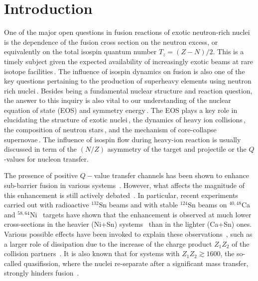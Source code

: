 \section{Introduction}

One of the major open questions in fusion reactions of exotic neutron-rich nuclei
is the dependence of the fusion cross section on the neutron excess,
or equivalently on the total isospin quantum number $T_z = (Z-N)/2$.
This is a timely subject given the expected
availability of increasingly exotic beams at rare isotope facilities\,\citep{balantekin2014}.
The influence of isospin dynamics on fusion is also one of the key questions pertaining to the
production of superheavy elements using neutron rich nuclei\,\citep{loveland2007}.
Besides being a fundamental nuclear structure and reaction question, the answer to this inquiry
is also vital to our understanding of the nuclear equation of state (EOS) and symmetry energy\,\citep{li2014}.
The EOS plays a key role in elucidating the structure of exotic nuclei\,\citep{chen2015},
the dynamics of heavy ion collisions\,\citep{danielewicz2002,tsang2009},
the composition of neutron stars\,\citep{haensel1990,chamel2008,horowitz2004,utama2016}, and the mechanism of core-collapse supernovae\,\citep{bonche1981,watanabe2009,shen2011}.
The influence of isospin flow during heavy-ion reaction is usually discussed in term of the
$(N/Z)$ asymmetry of the target and projectile or the $Q$-values for nucleon transfer.

The presence of positive $Q-$value transfer channels has been shown to enhance sub-barrier fusion in various systems~\citep{jiang2014a}.
However, what affects the magnitude of this enhancement is still actively debated~\citep{kohley2011,kohley2013,kolata2012,jiang2015,liang2016}.
In particular, recent experiments carried out
with radioactive $^{132}$Sn beams and with stable $^{124}$Sn beams on
$^{40,48}$Ca~\citep{kolata2012} and $^{58,64}$Ni~\citep{kohley2011} targets have shown that the enhancement is observed at much lower cross-sections in the heavier (Ni+Sn) systems~\citep{jiang2015} than in the lighter (Ca+Sn) ones.
Various possible effects have been invoked to explain these observations~\citep{liang2016},
such as a larger role of dissipation due to the increase of the charge product $Z_1Z_2$ of the collision partners~\citep{wolfs1987,evers2011,rafferty2016}.
It is also known that for systems with $Z_1Z_2\gtrsim1600$, the so-called quasifission, where the nuclei re-separate after a significant mass transfer, strongly hinders fusion~\citep{toke1985}.

